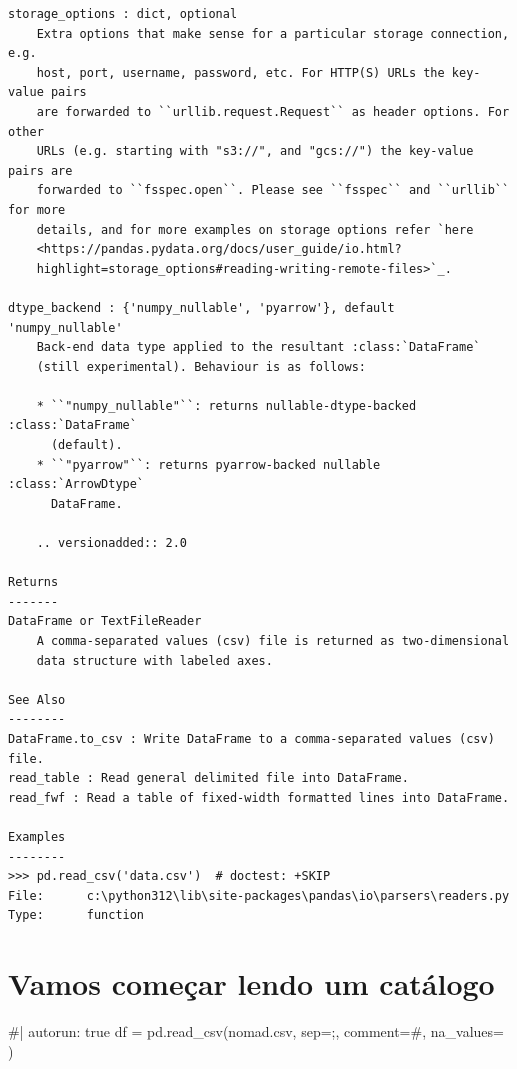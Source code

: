\documentclass[
  letterpaper,
  DIV=11,
  numbers=noendperiod]{scrreprt}
\newenvironment{Shaded}{\begin{snugshade}}{\end{snugshade}}
\newcommand{\NormalTok}[1]{\textcolor[rgb]{0.00,0.23,0.31}{#1}}
\begin{document}
\begin{verbatim}
storage_options : dict, optional
    Extra options that make sense for a particular storage connection, e.g.
    host, port, username, password, etc. For HTTP(S) URLs the key-value pairs
    are forwarded to ``urllib.request.Request`` as header options. For other
    URLs (e.g. starting with "s3://", and "gcs://") the key-value pairs are
    forwarded to ``fsspec.open``. Please see ``fsspec`` and ``urllib`` for more
    details, and for more examples on storage options refer `here
    <https://pandas.pydata.org/docs/user_guide/io.html?
    highlight=storage_options#reading-writing-remote-files>`_.

dtype_backend : {'numpy_nullable', 'pyarrow'}, default 'numpy_nullable'
    Back-end data type applied to the resultant :class:`DataFrame`
    (still experimental). Behaviour is as follows:

    * ``"numpy_nullable"``: returns nullable-dtype-backed :class:`DataFrame`
      (default).
    * ``"pyarrow"``: returns pyarrow-backed nullable :class:`ArrowDtype`
      DataFrame.

    .. versionadded:: 2.0

Returns
-------
DataFrame or TextFileReader
    A comma-separated values (csv) file is returned as two-dimensional
    data structure with labeled axes.

See Also
--------
DataFrame.to_csv : Write DataFrame to a comma-separated values (csv) file.
read_table : Read general delimited file into DataFrame.
read_fwf : Read a table of fixed-width formatted lines into DataFrame.

Examples
--------
>>> pd.read_csv('data.csv')  # doctest: +SKIP
File:      c:\python312\lib\site-packages\pandas\io\parsers\readers.py
Type:      function
\end{verbatim}

\section{Vamos começar lendo um
catálogo}\label{vamos-comeuxe7ar-lendo-um-catuxe1logo}

\begin{Shaded}
\begin{Highlighting}[]
\NormalTok{\#| autorun: true}
\NormalTok{df = pd.read\_csv(\textquotesingle{}nomad.csv\textquotesingle{}, sep=\textquotesingle{};\textquotesingle{}, comment=\textquotesingle{}\#\textquotesingle{}, }
\NormalTok{                 na\_values=\textquotesingle{}      \textquotesingle{})}
\end{Highlighting}
\end{Shaded}
\end{document}
